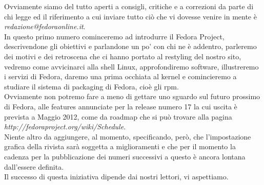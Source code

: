 Ovviamente siamo del tutto aperti a consigli, critiche e a correzioni da parte di chi legge ed il riferimento a cui inviare tutto ciò che vi dovesse venire in mente è {\itshape redazione@fedoraonline.it}.\\

In questo primo numero cominceremo ad introdurre il Fedora Project, descrivendone gli obiettivi e parlandone un po' con chi ne è addentro, parleremo dei motivi e dei retroscena che ci hanno portato al restyling del nostro sito, vedremo come avvicinarci alla shell Linux, approfondiremo software, illustreremo i servizi di Fedora, daremo una prima occhiata al kernel e comincieremo a studiare il sistema di packaging di Fedora, cioè gli rpm.\\

Ovviamente non potremo fare a meno di gettare uno sguardo sul futuro prossimo di Fedora, alle features annunciate per la release numero 17 la cui uscita è prevista a Maggio 2012, come da roadmap che si può trovare alla pagina {\itshape http://fedoraproject.org/wiki/Schedule}.\\

Niente altro da aggiungere, al momento, specificando, però, che l'impostazione grafica della rivista sarà soggetta a miglioramenti e che per il momento la cadenza per la pubblicazione dei numeri successivi a questo è ancora lontana dall'essere definita.\\

Il successo di questa iniziativa dipende dai nostri lettori, vi aspettiamo. 



